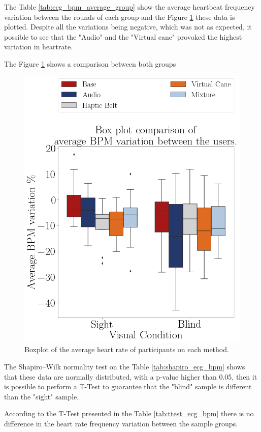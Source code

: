 The Table \ref{tab:ecg_bpm_average_group} show the average heartbeat frequency variation between the rounds of each group and the Figure \ref{fig:boxplot_ecg_bpm_scene} these data is plotted. Despite all the variations being negative, which was not as expected, it possible to see that the "Audio" and the "Virtual cane" provoked the highest variation in heartrate.




The Figure \ref{fig:boxplot_ecg_bpm_scene} shows a comparison between both groups

\begin{figure}[!htb]
    \centering
    \includegraphics[width = 0.5\linewidth]{Resultados/ECG/Figuras/png/boxplot_ecg_bpm_scene.png}
    \caption{Boxplot of the average heart rate of participants on each method.}
    \label{fig:boxplot_ecg_bpm_scene}
\end{figure}

The Shapiro–Wilk normality test on the Table \ref{tab:shapiro_ecg_bpm} shows that these data are normally distributed, with a p-value higher than 0.05, then it is possible to perform a T-Test to guarantee that the "blind" sample is different than the "sight" sample.

According to the T-Test presented in the Table \ref{tab:ttest_ecg_bpm} there is no difference in the heart rate frequency variation between the sample groups.

\begin{table}[!htb]
    \begin{minipage}{.45\linewidth}
        
    \end{minipage}
    \hfill
    \begin{minipage}{.45\linewidth}
        \vspace{-2.75cm}
        
    \end{minipage}
\end{table}

